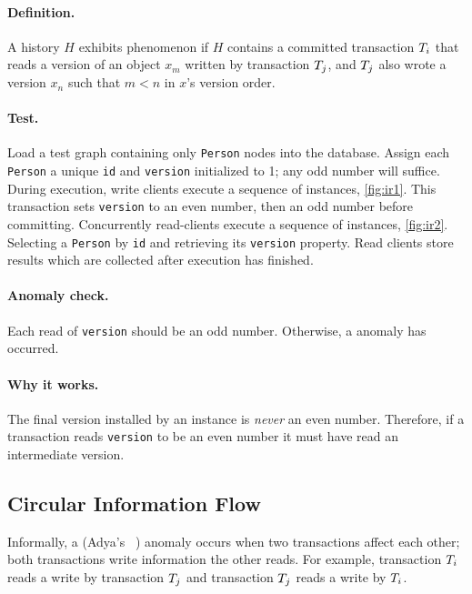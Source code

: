 \paragraph{Definition.}
A history $H$ exhibits phenomenon  if $H$ contains a committed transaction $T_i$ that reads a version of an object $x_m$ written by transaction $T_j$, and $T_j$ also wrote a version $x_n$ such that $m < n$ in $x$'s version order.

\paragraph{Test.}
Load a test graph containing only \texttt{Person} nodes into the database. Assign each \texttt{Person} a unique \texttt{id} and \texttt{version} initialized to 1; any odd number will suffice.
During execution, write clients execute a sequence of  instances, \autoref{fig:ir1}.
This transaction sets \texttt{version} to an even number, then an odd number before committing.
Concurrently read-clients execute a sequence of  instances, \autoref{fig:ir2}.
Selecting a \texttt{Person} by \texttt{id} and retrieving its \texttt{version} property.
Read clients store results which are collected after execution has finished.

\paragraph{Anomaly check.}
Each read of \texttt{version} should be an odd number.
Otherwise, a  anomaly has occurred.

\paragraph{Why it works.}
The final version installed by an  instance is \emph{never} an even number.
Therefore, if a transaction reads \texttt{version} to be an even number it must have read an intermediate version.

\subsection*{Circular Information Flow}

Informally, a  (Adya's ~\cite{adya1999weak}) anomaly occurs when two transactions affect each other; \ie both transactions write information the other reads.
For example, transaction $T_i$ reads a write by transaction $T_j$ and transaction $T_j$ reads a write by $T_i$.

